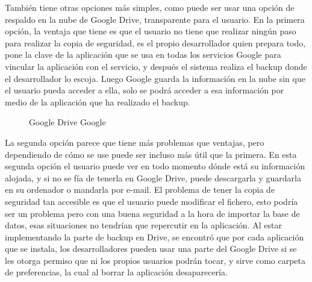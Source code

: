 También tiene otras opciones más simples, como puede ser usar una opción de respaldo en la nube de Google Drive\cite{GDrive}, transparente para el usuario.
En la primera opción, la ventaja que tiene es que el usuario no tiene que realizar ningún paso para realizar la copia de seguridad, es el propio desarrollador quien prepara todo, pone la clave de la aplicación que se usa en todas los servicios Google para vincular la aplicación con el servicio, y después el sistema realiza el backup donde el desarrollador lo escoja. Luego Google guarda la información en la nube sin que el usuario pueda acceder a ella, solo se podrá acceder a esa información por medio de la aplicación que ha realizado el backup.

\begin{figure}[H] 
  \begin{center} 
    \caption{Google Drive Google} 
    \label{fig:Drive} 
  \end{center} 
\end{figure}

La segunda opción parece que tiene más problemas que ventajas, pero dependiendo de cómo se use puede ser incluso más útil que la primera.
En esta segunda opción el usuario puede ver en todo momento dónde está su información alojada, y si no se fía de tenerla en Google Drive, puede descargarla y guardarla en su ordenador o mandarla por e-mail.
El problema de tener la copia de seguridad tan accesible es que el usuario puede modificar el fichero, esto podría ser un problema pero con una buena seguridad a la hora de importar la base de datos, esas situaciones no tendrían que repercutir en la aplicación.
Al estar implementando la parte de backup en Drive, se encontró que por cada aplicación que se instala, los desarrolladores pueden usar una parte del Google Drive si se les otorga permiso que ni los propios usuarios podrán tocar, y sirve como carpeta de preferencias, la cual al borrar la aplicación desaparecería.

